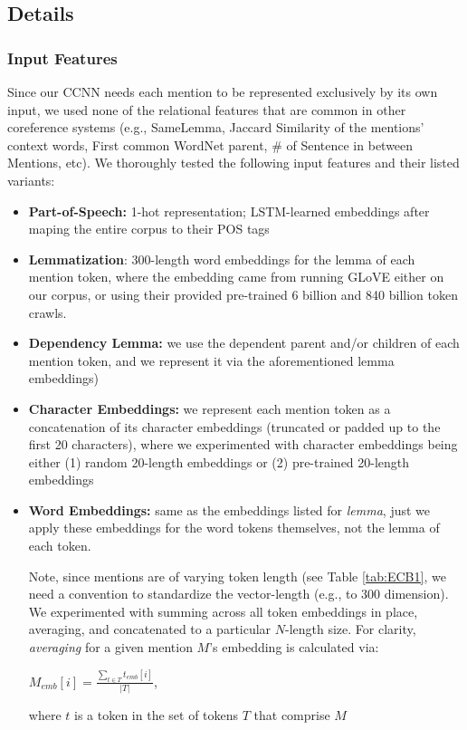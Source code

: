 \documentclass[11pt,a4paper]{article}
\begin{document}
\subsection{Details}
\subsubsection{Input Features}
Since our CCNN needs each mention to be represented exclusively by its own input, we used none of the relational features that are common in other coreference systems (e.g., SameLemma, Jaccard Similarity of the mentions' context words, First common WordNet parent, \# of Sentence in between Mentions, etc).  We thoroughly tested the following input features and their listed variants:
\begin{itemize}
  \item \textbf{Part-of-Speech:} 1-hot representation; LSTM-learned embeddings after maping the entire corpus to their POS tags
  \item \textbf{Lemmatization}: 300-length word embeddings for the lemma of each mention token, where the embedding came from running GLoVE \cite{pennington2014glove} either on our corpus, or using their provided pre-trained 6 billion and 840 billion token crawls.
  \item \textbf{Dependency Lemma:} we use the dependent parent and/or children of each mention token, and we represent it via the aforementioned lemma embeddings)
  \item \textbf{Character Embeddings:} we represent each mention token as a concatenation of its character embeddings (truncated or padded up to the first 20 characters), where we experimented with character embeddings being either (1) random 20-length embeddings or (2) pre-trained 20-length embeddings
  \item \textbf{Word Embeddings:} same as the embeddings listed for \textit{lemma}, just we apply these embeddings for the word tokens themselves, not the lemma of each token.
  
Note, since mentions are of varying token length (see Table \ref{tab:ECB1}, we need a convention to standardize the vector-length (e.g., to 300 dimension).  We experimented with summing across all token embeddings in place, averaging, and concatenated to a particular $N$-length size.  For clarity, \textit{averaging} for a given mention $M$'s embedding is calculated via:

$M_{emb}[i] = \frac{\sum_{t \in T}t_{emb}[i]}{|T|}$,

where $t$ is a token in the set of tokens $T$ that comprise $M$


\end{itemize}
\end{document}
